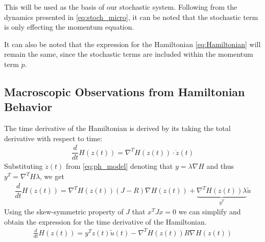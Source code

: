 This will be used as the basis of our stochastic system. Following from the dynamics presented in \autoref{eq:stoch_micro}, it can be noted that the stochastic term is only effecting the momentum equation.

It can also be noted that the expression for the Hamiltonian \autoref{eq:Hamiltonian} will remain the same, since the stochastic terms are included within the momentum term $\dot p$. 

\subsection{Macroscopic Observations from Hamiltonian Behavior}
The time derivative of the Hamiltonian is derived by its taking the total derivative with respect to time:
\begin{align*}
    \dfrac{d}{dt}H(z(t)) = \nabla^T H(z(t))\cdot \dot z(t)
\end{align*}
Substituting $\dot z(t)$ from \autoref{eq:ph_model} denoting that $y = \lambda \nabla H$ and thus $y^T = \nabla^T H \lambda$, we get
\begin{align*}
    \dfrac{d}{dt}H(z(t)) = \nabla^T H(z(t))(J-R)\nabla H(z(t)) + \underbrace{\nabla^T H(z(t)) \lambda}_{y^T} \tilde u
\end{align*}
Using the skew-symmetric property of $J$ that $x^TJx=0$ we can simplify and obtain the expression for the time derivative of the Hamiltonian.
\begin{align}
    \frac{d}{dt}H(z(t)) = y^Tz(t)\tilde u(t) - \nabla^T H(z(t))R \nabla H(z(t))
\end{align}

